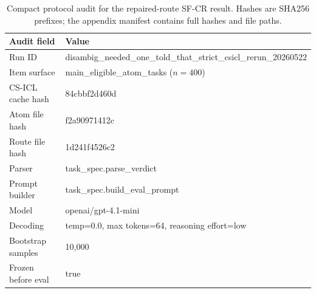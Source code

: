 \begin{table}[t]
\centering
\small
\begin{tabular}{ll}
\toprule
Audit field & Value \\
\midrule
Run ID & disambig\_needed\_one\_told\_that\_strict\_csicl\_rerun\_20260522 \\
Item surface & main\_eligible\_atom\_tasks ($n=400$) \\
CS-ICL cache hash & 84cbbf2d460d \\
Atom file hash & f2a90971412c \\
Route file hash & 1d241f4526c2 \\
Parser & task\_spec.parse\_verdict \\
Prompt builder & task\_spec.build\_eval\_prompt \\
Model & openai/gpt-4.1-mini \\
Decoding & temp=0.0, max tokens=64, reasoning effort=low \\
Bootstrap samples & 10,000 \\
Frozen before eval & true \\
\bottomrule
\end{tabular}
\caption{Compact protocol audit for the repaired-route SF-CR result. Hashes are SHA256 prefixes; the appendix manifest contains full hashes and file paths.}
\label{tab:sfcr_protocol_audit}
\end{table}